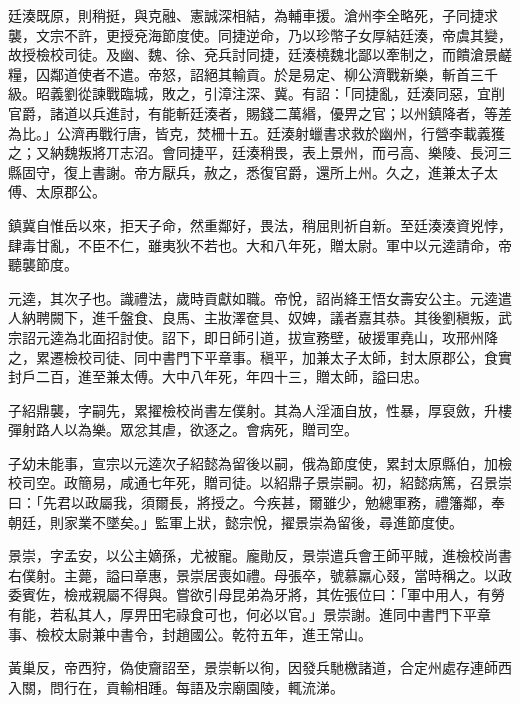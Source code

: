 \begin{pinyinscope}
 廷湊既原，則稍挺，與克融、憲誠深相結，為輔車援。滄州李全略死，子同捷求襲，文宗不許，更授兗海節度使。同捷逆命，乃以珍幣子女厚結廷湊，帝虞其變，故授檢校司徒。及幽、魏、徐、兗兵討同捷，廷湊橈魏北鄙以牽制之，而饋滄景鹺糧，囚鄰道使者不遣。帝怒，詔絕其輸貢。於是易定、柳公濟戰新樂，斬首三千級。昭義劉從諫戰臨城，敗之，引漳注深、冀。有詔：「同捷亂，廷湊同惡，宜削官爵，諸道以兵進討，有能斬廷湊者，賜錢二萬緡，優畀之官；以州鎮降者，等差為比。」公濟再戰行唐，皆克，焚柵十五。廷湊射蠟書求救於幽州，行營李載義獲之；又納魏叛將丌志沼。會同捷平，廷湊稍畏，表上景州，而弓高、樂陵、長河三縣固守，復上書謝。帝方厭兵，赦之，悉復官爵，還所上州。久之，進兼太子太傅、太原郡公。



 鎮冀自惟岳以來，拒天子命，然重鄰好，畏法，稍屈則祈自新。至廷湊湊資兇悖，肆毒甘亂，不臣不仁，雖夷狄不若也。大和八年死，贈太尉。軍中以元逵請命，帝聽襲節度。



 元逵，其次子也。識禮法，歲時貢獻如職。帝悅，詔尚絳王悟女壽安公主。元逵遣人納聘闕下，進千盤食、良馬、主妝澤奩具、奴婢，議者嘉其恭。其後劉稹叛，武宗詔元逵為北面招討使。詔下，即日師引道，拔宣務壁，破援軍堯山，攻邢州降之，累遷檢校司徒、同中書門下平章事。稹平，加兼太子太師，封太原郡公，食實封戶二百，進至兼太傅。大中八年死，年四十三，贈太師，謚曰忠。



 子紹鼎襲，字嗣先，累擢檢校尚書左僕射。其為人淫湎自放，性暴，厚裒斂，升樓彈射路人以為樂。眾忿其虐，欲逐之。會病死，贈司空。



 子幼未能事，宣宗以元逵次子紹懿為留後以嗣，俄為節度使，累封太原縣伯，加檢校司空。政簡易，咸通七年死，贈司徒。以紹鼎子景崇嗣。初，紹懿病篤，召景崇曰：「先君以政屬我，須爾長，將授之。今疾甚，爾雖少，勉總軍務，禮籓鄰，奉朝廷，則家業不墜矣。」監軍上狀，懿宗悅，擢景崇為留後，尋進節度使。



 景崇，字孟安，以公主嫡孫，尤被寵。龐勛反，景崇遣兵會王師平賊，進檢校尚書右僕射。主薨，謚曰章惠，景崇居喪如禮。母張卒，號慕羸心叕，當時稱之。以政委賓佐，檢戒親屬不得與。嘗欲引母昆弟為牙將，其佐張位曰：「軍中用人，有勞有能，若私其人，厚畀田宅祿食可也，何必以官。」景崇謝。進同中書門下平章事、檢校太尉兼中書令，封趙國公。乾符五年，進王常山。



 黃巢反，帝西狩，偽使齎詔至，景崇斬以徇，因發兵馳檄諸道，合定州處存連師西入關，問行在，貢輸相踵。每語及宗廟園陵，輒流涕。




\end{pinyinscope}
